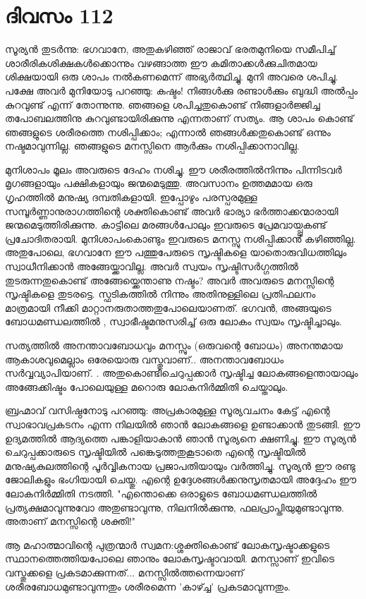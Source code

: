 \newpage
\section{ദിവസം 112}


സൂര്യന്‍ തുടര്‍ന്നു: ഭഗവാനേ, അതുകഴിഞ്ഞ്‌ രാജാവ്‌ ഭരതമുനിയെ സമീപിച്ച്‌ ശാരീരികശിക്ഷകള്‍ക്കൊന്നും വഴങ്ങാത്ത ഈ കമിതാക്കള്‍ക്കുചിതമായ ശിക്ഷയായി ഒരു ശാപം നല്‍കണമെന്ന് അഭ്യര്‍ത്ഥിച്ചു. മുനി അവരെ ശപിച്ചു. പക്ഷേ അവര്‍ മുനിയോടു പറഞ്ഞു: കഷ്ടം! നിങ്ങള്‍ക്കു രണ്ടാള്‍ക്കും ബുദ്ധി അല്‍പ്പം കുറവുണ്ട് എന്ന് തോന്നുന്നു. ഞങ്ങളെ ശപിച്ചതുകൊണ്ട്‌ നിങ്ങളാര്‍ജ്ജിച്ച തപോബലത്തിനു കുറവുണ്ടായിരിക്കുന്നു എന്നതാണ് സത്യം. ആ ശാപം കൊണ്ട്‌ ഞങ്ങളുടെ ശരീരത്തെ നശിപ്പിക്കാം; എന്നാല്‍ ഞങ്ങള്‍ക്കതുകൊണ്ട്‌ ഒന്നും നഷ്ടമാവുന്നില്ല. ഞങ്ങളുടെ മനസ്സിനെ ആര്‍ക്കും നശിപ്പിക്കാനാവില്ല.

മുനിശാപം മൂലം അവരുടെ ദേഹം നശിച്ചു. ഈ ശരീരത്തില്‍നിന്നും പിന്നിടവര്‍ മൃഗങ്ങളായും പക്ഷികളായും ജന്മമെടുത്തു. അവസാനം ഉത്തമമായ ഒരു ഗൃഹത്തില്‍ മനുഷ്യ ദമ്പതികളായി. ഇപ്പോഴും പരസ്പരമുള്ള സമ്പൂര്‍ണ്ണാനുരാഗത്തിന്റെ ശക്തികൊണ്ട്‌ അവര്‍ ഭാര്യാ ഭര്‍ത്താക്കന്മാരായി ജന്മമെടുത്തിരിക്കുന്നു. കാട്ടിലെ മരങ്ങള്‍പോലും ഇവരുടെ പ്രേമവായ്പ്പുകണ്ട്‌ പ്രചോദിതരായി. മുനിശാപംകൊണ്ടും ഇവരുടെ മനസ്സു നശിപ്പിക്കാന്‍ കഴിഞ്ഞില്ല. അതുപോലെ, ഭഗവാനേ ഈ പത്തുപേരുടെ സൃഷ്ടികളെ യാതൊരുവിധത്തിലും സ്വാധീനിക്കാന്‍ അങ്ങേയ്ക്കാവില്ല. അവര്‍ സ്വയം സൃഷ്ടിസര്‍ഗ്ഗത്തില്‍ തുടരുന്നതുകൊണ്ട്‌ അങ്ങേയ്ക്കെന്താണു നഷ്ടം? അവര്‍ അവരുടെ മനസ്സിന്റെ സൃഷ്ടികളെ തുടരട്ടെ. സ്ഫടികത്തില്‍ നിന്നും  അതിനുള്ളിലെ പ്രതിഫലനം മാത്രമായി നീക്കി മാറ്റാനരുതാത്തതുപോലെയാണത്‌. ഭഗവന്‍, അങ്ങയുടെ ബോധമണ്ഡലത്തില്‍ ,  സ്വാഭീഷ്ടമനുസരിച്ച്  ഒരു ലോകം സ്വയം സൃഷ്ടിച്ചാലും.

സത്യത്തില്‍ അനന്താവബോധവും മനസ്സും (ഒരുവന്റെ ബോധം) അനന്തമായ ആകാശവുമെല്ലാം ഒരേയൊരു വസ്തുവാണ്‌.. അനന്താവബോധം സര്‍വ്വവ്യാപിയാണ്‌. . അതുകൊണ്ടീചെറുപ്പക്കാര്‍ സൃഷ്ടിച്ച ലോകങ്ങളെന്തായാലും അങ്ങേക്കിഷ്ടം പോലെയുള്ള  മറൊരു ലോകനിര്‍മ്മിതി ചെയ്താലും.

ബ്രഹ്മാവ്‌ വസിഷ്ഠനോടു പറഞ്ഞു: അപ്രകാരമുള്ള സൂര്യവചനം കേട്ട്‌ എന്റെ സ്വാഭാവപ്രകടനം എന്ന നിലയില്‍ ഞാന്‍ ലോകങ്ങളെ ഉണ്ടാക്കാന്‍ തുടങ്ങി. ഈ ഉദ്യമത്തില്‍ ആദ്യത്തെ പങ്കാളിയാകാന്‍ ഞാന്‍ സൂര്യനെ ക്ഷണിച്ചു. ഈ സൂര്യന്‍ ചെറുപ്പക്കാരുടെ സൃഷ്ടിയില്‍ പങ്കെടുത്തതുകൂടാതെ എന്റെ സൃഷ്ടിയില്‍ മനുഷ്യകുലത്തിന്റെ പൂര്‍വ്വികനായ പ്രജാപതിയായും വര്‍ത്തിച്ചു. സൂര്യന്‍ ഈ രണ്ടു ജോലികളും ഭംഗിയായി ചെയ്തു. എന്റെ ഉദ്ദേശങ്ങള്‍ക്കനുസൃതമായി അദ്ദേഹം ഈ ലോകനിര്‍മ്മിതി നടത്തി. "എന്തൊക്കെ ഒരാളുടെ ബോധമണ്ഡലത്തില്‍ പ്രത്യക്ഷമാവുന്നുവോ അതുണ്ടാവുന്നു, നിലനില്‍ക്കുന്നു, ഫലപ്രാപ്തിയുമുണ്ടാവുന്നു. അതാണ്‌ മനസ്സിന്റെ ശക്തി!"

ആ മഹാത്മാവിന്റെ പുത്രന്മാര്‍ സ്വമന:ശ്ശക്തികൊണ്ട്‌ ലോകസൃഷ്ടാക്കളുടെ സ്ഥാനത്തെത്തിയപോലെ ഞാനും ലോകസൃഷ്ടാവായി. മനസ്സാണ്‌ ഇവിടെ വസ്തുക്കളെ പ്രകടമാക്കുന്നത്‌...  മനസ്സില്‍ത്തന്നെയാണ് ശരീരബോധമുണ്ടാവുന്നതും ശരീരമെന്ന 'കാഴ്ച്ച' പ്രകടമാവുന്നതും. 
